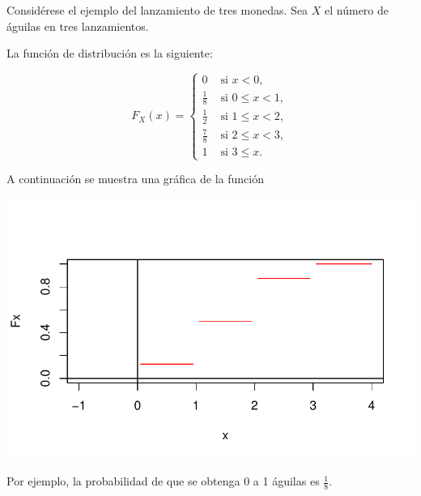 \documentclass[
  us-letterpaper,
]{scrreprt}
\theoremstyle{plain}
\theoremstyle{definition}
\theoremstyle{definition}
\theoremstyle{plain}
\theoremstyle{remark}
\begin{document}
\begin{tcolorbox}[enhanced jigsaw, breakable, colbacktitle=quarto-callout-caution-color!10!white, rightrule=.15mm, toptitle=1mm, colback=white, left=2mm, colframe=quarto-callout-caution-color-frame, bottomtitle=1mm, opacitybacktitle=0.6, leftrule=.75mm, arc=.35mm, title={Ejemplo (\textbf{\emph{Lanzar 3 monedas}})}, coltitle=black, titlerule=0mm, opacityback=0, bottomrule=.15mm, toprule=.15mm]

Considérese el ejemplo del lanzamiento de tres monedas. Sea \(X\) el
número de águilas en tres lanzamientos.

La función de distribución es la siguiente:

\[ F_X(x)=\begin{cases}0 & \text{ si } x<0,\\ \frac{1}{8} & \text{ si } 0\leq x< 1,\\ \frac{1}{2} & \text{ si  } 1\leq x< 2,\\ \frac{7}{8} & \text{ si  } 2\leq x<3,\\ 1 & \text{ si } 3\leq x.\end{cases} \]

A continuación se muestra una gráfica de la función

\includegraphics{probabilidad_files/figure-pdf/unnamed-chunk-1-1.pdf}

Por ejemplo, la probabilidad de que se obtenga 0 a 1 águilas es
\(\frac{1}{8}\).

\end{tcolorbox}
\end{document}
